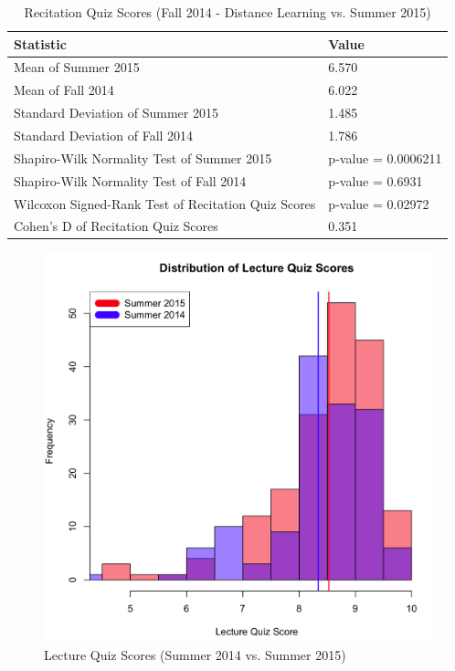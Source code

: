 \pagebreak\clearpage

\begin{small}
\begin{table}
  \centering
  \begin{tabular}{|l|l|}
    \hline
    \textbf{Statistic} & \textbf{Value} \\
	\hline
	Mean of Summer 2015 & 6.570 \\
	\hline
	Mean of Fall 2014 & 6.022 \\
	\hline
	Standard Deviation of Summer 2015 & 1.485 \\
	\hline
	Standard Deviation of Fall 2014 & 1.786 \\
	\hline
	Shapiro-Wilk Normality Test of Summer 2015 & p-value = 0.0006211 \\
	\hline
	Shapiro-Wilk Normality Test of Fall 2014 & p-value = 0.6931 \\
	\hline
	Wilcoxon Signed-Rank Test of Recitation Quiz Scores & p-value = 0.02972 \\
	\hline
	Cohen's D of Recitation Quiz Scores & 0.351 \\
	\hline
  \end{tabular}
	\caption{Recitation Quiz Scores (Fall 2014 - Distance Learning vs. Summer 2015)}
  \label{tab:rqf14dSu15}
\end{table}
\end{small}

\pagebreak\clearpage

\begin{figure}
	\centering
	\includegraphics[width=5in]{img/chapter4/lq_su15_vs_su14}
	\caption{Lecture Quiz Scores (Summer 2014 vs. Summer 2015)}
  \label{fig:lqSu14Su15}
\end{figure}

